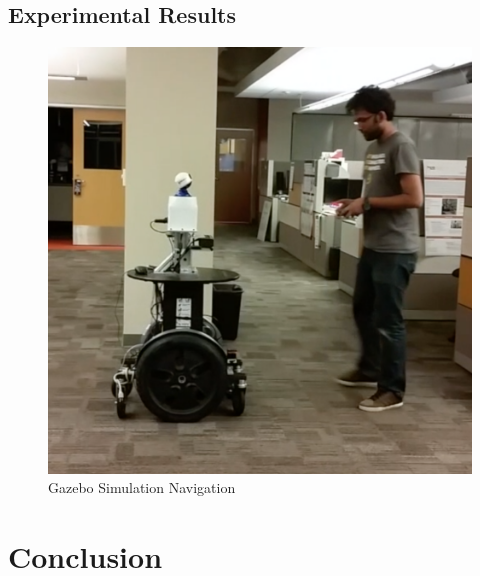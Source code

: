 \documentclass[journal]{IEEEtran}
\begin{document}
\subsection{Experimental Results}
\begin{figure}[h!]
\centering
\includegraphics[scale=0.20]{jeeves_exp.png} 
\caption{Gazebo Simulation Navigation\label{fig:gazebo}}
\end{figure}

\section{Conclusion}



\end{document}

